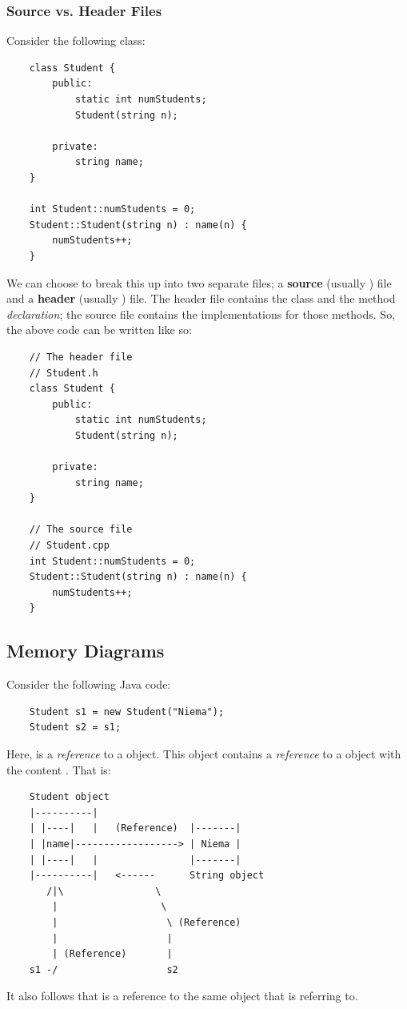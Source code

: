 \documentclass[letterpaper]{article}
\begin{document}
\subsubsection{Source vs. Header Files}
Consider the following class: 
\begin{verbatim}
    class Student {
        public: 
            static int numStudents;
            Student(string n);
        
        private: 
            string name; 
    }

    int Student::numStudents = 0;
    Student::Student(string n) : name(n) {
        numStudents++;
    }
\end{verbatim}
We can choose to break this up into two separate files; a \textbf{source} (usually ) file and a \textbf{header} (usually ) file. The header file contains the class and the method \emph{declaration}; the source file contains the implementations for those methods. So, the above code can be written like so: 
\begin{verbatim}
    // The header file 
    // Student.h
    class Student {
        public: 
            static int numStudents;
            Student(string n);
        
        private: 
            string name; 
    }

    // The source file 
    // Student.cpp 
    int Student::numStudents = 0;
    Student::Student(string n) : name(n) {
        numStudents++;
    }
\end{verbatim}

\subsection{Memory Diagrams}
Consider the following Java code: 
\begin{verbatim}
    Student s1 = new Student("Niema");
    Student s2 = s1;
\end{verbatim}
Here,  is a \emph{reference} to a  object. This  object contains a \emph{reference} to a  object with the content . That is: 
\begin{verbatim}
    Student object
    |----------|
    | |----|   |   (Reference)  |-------|
    | |name|------------------> | Niema |
    | |----|   |                |-------|
    |----------|   <------      String object
       /|\                \
        |                  \
        |                   \ (Reference)
        |                   |
        | (Reference)       |
    s1 -/                   s2
\end{verbatim} 
It also follows that  is a reference to the same object that  is referring to. 
\end{document}

